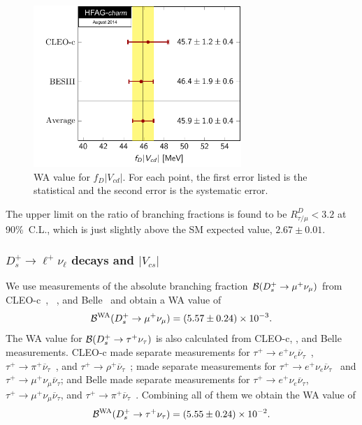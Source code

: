 \begin{figure}[hbt!]
\centering
\includegraphics[width=0.7\textwidth]{figures/charm/fDVcd.pdf}
\caption{
WA value for $f_{D}|V_{cd}|$. For each point, the first error listed is the statistical and the second error is the systematic error.
\label{fig:ExpDLeptonic}
}
\end{figure}
 
The upper limit on the ratio of branching fractions is found to be $R_{\tau/\mu}^D<3.2$ at 90\%~C.L., which is just slightly above the SM expected value, $2.67\pm0.01$.

\subsubsection{$D_s^+\to \ell^+\nu_{\ell}$ decays and $|V_{cs}|$}

We use measurements of the absolute branching fraction ${\cal B}(D_s^+\to\mu^+\nu_{\mu})$ from CLEO-c~\cite{Alexander:2009ux}, \babar~\cite{delAmoSanchez:2010jg},
and Belle~\cite{Zupanc:2013byn} and obtain a WA value of
\[
 {\cal B}^{\rm WA}(D_{s}^+\to\mu^+\nu_{\mu}) = (5.57\pm0.24)\times10^{-3}.
\]
The WA value for ${\cal B}(D_s^+\to\tau^+\nu_{\tau})$ is also calculated from CLEO-c, \babar, and Belle measurements. 
CLEO-c made separate measurements for $\tau^+\to e^+\nu_e\overline{\nu}{}_{\tau}$~\cite{Naik:2009tk},
$\tau^+\to\pi^+\overline{\nu}{}_{\tau}$~\cite{Alexander:2009ux}, and
$\tau^+\to\rho^+\overline{\nu}{}_{\tau}$~\cite{Onyisi:2009th};
\babar made separate measurements for 
$\tau^+\to e^+\nu_e\overline{\nu}{}_{\tau}$~\cite{delAmoSanchez:2010jg} and $\tau^+\to \mu^+\nu_{\mu}\overline{\nu}{}_{\tau}$; and
Belle made separate measurements for $\tau^+\to e^+\nu_e\overline{\nu}{}_{\tau}$, $\tau^+\to \mu^+\nu_{\mu}\overline{\nu}{}_{\tau}$, 
and $\tau^+\to\pi^+\overline{\nu}{}_{\tau}$~\cite{Zupanc:2013byn}.
Combining all of them we obtain the WA value of
\[
 {\cal B}^{\rm WA}(D_{s}^+\to\tau^+\nu_{\tau}) = (5.55\pm0.24)\times10^{-2}.
\]

